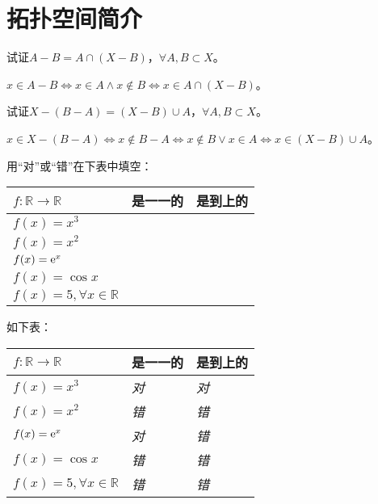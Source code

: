 
\chapter{拓扑空间简介}

\begin{xiti}
	\item 试证$\displaystyle A-B=A\cap (X-B)$，$\displaystyle \forall A,B\subset X$。

	\begin{zm}
			$  x\in A-B \iff x\in A \wedge x\notin B\iff x\in A\cap (X-B) $。
	\end{zm}

	\item 试证$X-(B-A)=(X-B)\cup A$，$ \forall A,B\subset X$。

	\begin{zm}
		$ x\in X-(B-A) \iff x\notin B-A \iff x\notin B \vee x\in A \iff x\in (X-B)\cup A $。
	\end{zm}

	\item 用“对”或“错”在下表中填空：
	\begin{table}[htb]
		\begin{tabularx}{\textwidth}{YYY}
			\toprule
			$f\colon \mathbb{R}\rightarrow \mathbb{R} $&是一一的&是到上的\\
			\midrule
			$f(x)=x^3 $& & \\
			$f(x)=x^2$& &\\
			$f(x)=\mathrm{e}^{x}$&&\\
			$f(x)=\cos x$&&\\
			$f(x)=5,\forall x\in \mathbb{R}$&&\\
			\bottomrule
		\end{tabularx}
	\end{table}

	\begin{jie}
		如下表：
		\begin{table}[htb]
			\begin{tabularx}{\textwidth}{YYY}
				\toprule
				$f\colon \mathbb{R}\rightarrow \mathbb{R} $&是一一的&是到上的\\
				\midrule
				$f(x)=x^3$&\textit{对} &\textit{对}\\
				$f(x)=x^2 $&\textit{错} &\textit{错}\\
				$f(x)=\mathrm{e}^{x}$&\textit{对}&\textit{错}\\
				$f(x)=\cos x$&\textit{错}&\textit{错}\\
				$f(x)=5,\forall x\in \mathbb{R}$&\textit{错}&\textit{错}\\
				\bottomrule
			\end{tabularx}
		\end{table}
	\end{jie}


\end{xiti}
